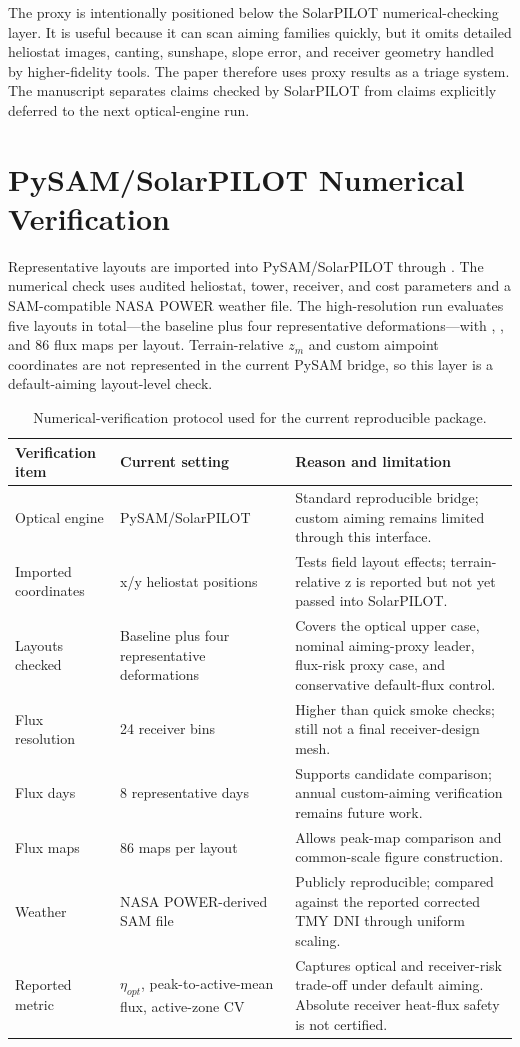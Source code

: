 \documentclass[final,3p,times]{elsarticle}
\begin{document}
The proxy is intentionally positioned below the SolarPILOT numerical-checking layer. It is useful because it can scan aiming families quickly, but it omits detailed heliostat images, canting, sunshape, slope error, and receiver geometry handled by higher-fidelity tools. The paper therefore uses proxy results as a triage system. The manuscript separates claims checked by SolarPILOT from claims explicitly deferred to the next optical-engine run.

\section{PySAM/SolarPILOT Numerical Verification}
Representative layouts are imported into PySAM/SolarPILOT through . The numerical check uses audited heliostat, tower, receiver, and cost parameters and a SAM-compatible NASA POWER weather file. The high-resolution run evaluates five layouts in total---the baseline plus four representative deformations---with , , and 86 flux maps per layout. Terrain-relative $z_m$ and custom aimpoint coordinates are not represented in the current PySAM bridge, so this layer is a default-aiming layout-level check.

\begin{longtable}{p{}p{}p{}}
\caption{Numerical-verification protocol used for the current reproducible package.} \label{tab:verification-protocol}\\
\toprule
Verification item & Current setting & Reason and limitation \\
\midrule
Optical engine & PySAM/SolarPILOT & Standard reproducible bridge; custom aiming remains limited through this interface. \\
Imported coordinates & x/y heliostat positions & Tests field layout effects; terrain-relative z is reported but not yet passed into SolarPILOT. \\
Layouts checked & Baseline plus four representative deformations & Covers the optical upper case, nominal aiming-proxy leader, flux-risk proxy case, and conservative default-flux control. \\
Flux resolution & 24 receiver bins & Higher than quick smoke checks; still not a final receiver-design mesh. \\
Flux days & 8 representative days & Supports candidate comparison; annual custom-aiming verification remains future work. \\
Flux maps & 86 maps per layout & Allows peak-map comparison and common-scale figure construction. \\
Weather & NASA POWER-derived SAM file & Publicly reproducible; compared against the reported corrected TMY DNI through uniform scaling. \\
Reported metric & $\eta_{opt}$, peak-to-active-mean flux, active-zone CV & Captures optical and receiver-risk trade-off under default aiming. Absolute receiver heat-flux safety is not certified. \\
\bottomrule
\end{longtable}
\end{document}
